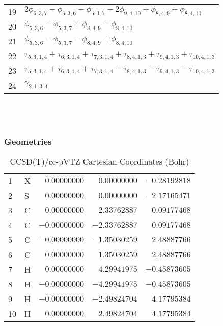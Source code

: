 \documentclass[10pt,oneside]{article}
\begin{document}
\begin{table}[h!]
\begin{tabular}{ll}
  19  & $2\phi_{6,3,7} - \phi_{5,3,6} - \phi_{5,3,7} - 2\phi_{9,4,10} + \phi_{8,4,9} + \phi_{8,4,10}$ \\
  20  & $\phi_{5,3,6} - \phi_{5,3,7} + \phi_{8,4,9} - \phi_{8,4,10}$ \\
  21  & $\phi_{5,3,6} - \phi_{5,3,7} - \phi_{8,4,9} + \phi_{8,4,10}$ \\
  22  & $\tau_{5,3,1,4} + \tau_{6,3,1,4} + \tau_{7,3,1,4} + \tau_{8,4,1,3} + \tau_{9,4,1,3} + \tau_{10,4,1,3}$ \\
  23  & $\tau_{5,3,1,4} + \tau_{6,3,1,4} + \tau_{7,3,1,4} - \tau_{8,4,1,3} - \tau_{9,4,1,3} - \tau_{10,4,1,3}$ \\
  24  & $\gamma_{2,1,3,4}$ \\
\end{tabular}
\end{table}

\clearpage

\subsection{\ \ \ }

\subsubsection*{Geometries}
\begin{table}[h!]
\centering
\caption{CCSD(T)/cc-pVTZ Cartesian Coordinates (Bohr)}
\begin{tabular}{llrrr}
1  & X  & $ 0.00000000$ & $ 0.00000000$ & $-0.28192818$ \\
2  & S  & $ 0.00000000$ & $ 0.00000000$ & $-2.17165471$ \\
3  & C  & $ 0.00000000$ & $ 2.33762887$ & $ 0.09177468$ \\
4  & C  & $-0.00000000$ & $-2.33762887$ & $ 0.09177468$ \\
5  & C  & $-0.00000000$ & $-1.35030259$ & $ 2.48887766$ \\
6  & C  & $ 0.00000000$ & $ 1.35030259$ & $ 2.48887766$ \\
7  & H  & $ 0.00000000$ & $ 4.29941975$ & $-0.45873605$ \\
8  & H  & $-0.00000000$ & $-4.29941975$ & $-0.45873605$ \\
9  & H  & $-0.00000000$ & $-2.49824704$ & $ 4.17795384$ \\
10 & H  & $ 0.00000000$ & $ 2.49824704$ & $ 4.17795384$ \\
\end{tabular}
\end{table}
\end{document}

